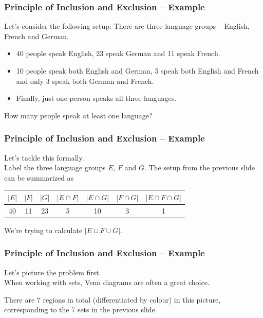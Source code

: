 \documentclass[aspectratio=169,11pt,usenames,dvipsnames,handout]{beamer}
\begin{document}
\begin{frame}
 \frametitle{Principle of Inclusion and Exclusion -- Example}
 Let's consider the following setup: There are three language groups -- English,
 French and German.\pause
 \begin{itemize}
  \item 40 people speak English, 23 speak German and 11 speak French.\pause
  \item 10 people speak both English and German, 5 speak both English and French
   and only 3 speak both German and French.\pause
  \item Finally, just one person speaks all three languages.
 \end{itemize}
 \pause
 How many people speak at least one language?
\end{frame}

\begin{frame}
 \frametitle{Principle of Inclusion and Exclusion -- Example}
 Let's tackle this formally.\pause\\
 Label the three language groups $E$, $F$ and $G$. The setup from the previous
 slide can be summarized as
 \begin{center}
  \begin{tabular}{ccccccc}
   $|E|$ & $|F|$ & $|G|$ & $|E \cap F|$ & $|E \cap G|$ & $|F \cap G|$ & $|E \cap
   F \cap G|$\\
   \midrule
   40 & 11 & 23 & 5 & 10 & 3 & 1
  \end{tabular}
 \end{center}
 \pause
 We're trying to calculate $|E \cup F \cup G|$.
\end{frame}

\begin{frame}
 \frametitle{Principle of Inclusion and Exclusion -- Example}
 Let's picture the problem first.\pause\\
 When working with sets, Venn diagrams are often a great choice.
 \begin{center}
 \end{center}
 \pause
 There are 7 regions in total (differentiated by colour) in this picture,
 corresponding to the 7 sets in the previous slide.
\end{frame}
\end{document}
